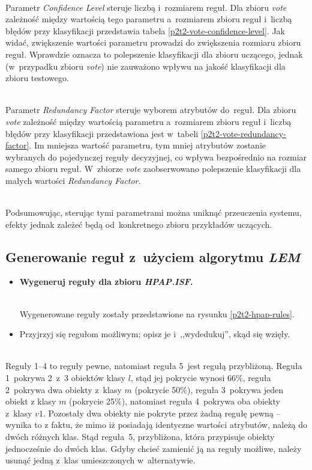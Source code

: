\begin{itemize}
	
	\\Parametr \emph{Confidence Level} steruje liczbą i~rozmiarem reguł. Dla zbioru \emph{vote} zależność między wartością tego parametru a~rozmiarem zbioru reguł i~liczbą błędów przy klasyfikacji przedstawia tabela \ref{p2t2-vote-confidence-level}. Jak widać, zwiększenie wartości parametru prowadzi do zwiększenia rozmiaru zbioru reguł. Wprawdzie oznacza to polepszenie klasyfikacji dla zbioru uczącego, jednak (w~przypadku zbioru \emph{vote}) nie zauważono wpływu na jakość klasyfikacji dla zbioru testowego.

	
	\\Parametr \emph{Redundancy Factor} steruje wyborem atrybutów do~reguł. Dla zbioru \emph{vote} zależność między wartością parametru a~rozmiarem zbioru reguł i~liczbą błędów przy klasyfikacji przedstawiona jest w~tabeli \ref{p2t2-vote-redundancy-factor}. Im mniejsza wartość parametru, tym mniej atrybutów zostanie wybranych do pojedynczej reguły decyzyjnej, co wpływa bezpośrednio na rozmiar samego zbioru reguł. W~zbiorze \emph{vote} zaobserwowano polepszenie klasyfikacji dla małych wartości \emph{Redundancy Factor}.

	\\Podsumowując, sterując tymi parametrami można uniknąć przeuczenia systemu, efekty jednak zależeć będą od~konkretnego zbioru przykładów uczących.
\end{itemize}


	\subsection{Generowanie reguł z~użyciem algorytmu \emph{LEM}}

\begin{itemize}
\item \textbf{Wygeneruj reguły dla zbioru \emph{HPAP.ISF}.}

	
	\\Wygenerowane reguły zostały przedstawione na rysunku \ref{p2t2-hpap-rules}.

\item Przyjrzyj się regułom możliwym; opisz je i~,,wydedukuj'', skąd się wzięły.
\end{itemize}

	\\Reguły 1--4 to reguły pewne, natomiast reguła 5~jest regułą przybliżoną. Reguła 1~pokrywa 2~z~3 obiektów klasy $l$, stąd jej pokrycie wynosi 66\%, reguła 2~pokrywa dwa obiekty z~klasy $m$ (pokrycie 50\%), reguła 3~pokrywa jeden obiekt z klasy $m$ (pokrycie 25\%), natomiast reguła 4~pokrywa oba obiekty z~klasy $v1$. Pozostały dwa obiekty nie pokryte przez żadną regułę pewną -- wynika to z faktu, że mimo iż posiadają identyczne wartości atrybutów, należą do dwóch różnych klas. Stąd reguła~5, przybliżona, która przypisuje obiekty jednocześnie do dwóch klas. Gdyby chcieć zamienić ją na reguły możliwe, należy usunąć jedną z~klas umieszczonych w~alternatywie.


